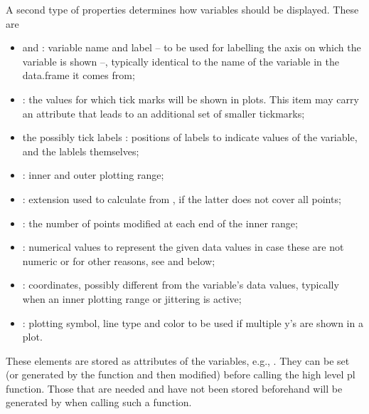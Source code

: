\documentclass[11pt]{article}\usepackage[]{graphicx}\usepackage[]{color}
\begin{document}
A second type of properties determines how variables should be displayed.
These are
\begin{itemize}
\item
   and : variable name and label --  
  to be used for labelling the axis on which the variable is shown --, 
  typically identical to the name of the variable
  in the data.frame it comes from;
\item
  : the values for which tick marks will be shown in plots.
  This item may carry an attribute  that leads to an additional
  set of smaller tickmarks;
\item
   the possibly tick labels :
  positions of labels to indicate values of the variable, and the lablels
  themselves;
\item
  : inner and outer plotting range;
\item
  : extension used to calculate 
  from , if the latter does not cover all points;
\item 
  : the number of points modified at each end of the inner range;
\item
  : numerical values to represent the given data values in
  case these are not numeric or for other reasons, see  and
   below;
\item
  : coordinates, possibly different from the variable's data
  values, typically when an inner plotting range or jittering is active;
\item
  : plotting symbol, line type and color to be used 
  if multiple y's are shown in a plot.
\end{itemize}
These elements are stored as attributes of the variables,
e.g., .
They can be set (or generated by the function  and 
then modified) before calling the high level pl function.
Those that are needed and have not been stored beforehand will be 
generated by  when calling such a function.
\end{document}
